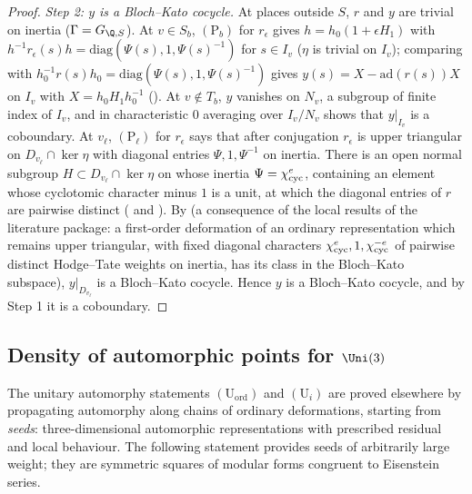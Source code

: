 \begin{proof}
\emph{Step 2: $y$ is a Bloch--Kato cocycle.} At places outside $S$, $r$ and $y$ are trivial on inertia ($\Gamma=G_{\Q,S}$). At $v\in S_b$,
$(\mathrm P_b)$ for $r_\epsilon$ gives $h=h_0(1+\epsilon H_1)$ with $h^{-1}r_\epsilon(s)h=\mathrm{diag}(\Psi(s),1,\Psi(s)^{-1})$ for $s\in I_v$ ($\eta$ is trivial on
$I_v$); comparing with $h_0^{-1}r(s)h_0=\mathrm{diag}(\Psi(s),1,\Psi(s)^{-1})$ gives $y(s)=X-\mathrm{ad}(r(s))X$ on $I_v$ with $X=h_0H_1h_0^{-1}$
(). At $v\notin T_b$, $y$ vanishes on $N_v$, a subgroup of finite index of $I_v$, and
in characteristic $0$ averaging over $I_v/N_v$ shows that $y|_{I_v}$ is a coboundary. At $v_\ell$, $(\mathrm P_\ell)$ for $r_\epsilon$ says that after
conjugation $r_\epsilon$ is upper triangular on $D_{v_\ell}\cap\ker\eta$ with diagonal entries $\Psi,1,\Psi^{-1}$ on inertia. There is an open normal
subgroup $H\subset D_{v_\ell}\cap\ker\eta$ on whose inertia $\Psi=\chi_{\mathrm{cyc}}^e$, containing an element whose cyclotomic character minus $1$ is a unit, at
which the diagonal entries of $r$ are pairwise distinct ( and ).
By  (a consequence of the local results of the literature package: a first-order
deformation of an ordinary representation which remains upper triangular, with fixed diagonal characters $\chi_{\mathrm{cyc}}^{e},1,\chi_{\mathrm{cyc}}^{-e}$ of
pairwise distinct Hodge--Tate weights on inertia, has its class in the Bloch--Kato subspace), $y|_{D_{v_\ell}}$ is a Bloch--Kato cocycle.
Hence $y$ is a Bloch--Kato cocycle, and by Step 1 it is a coboundary.
\end{proof}

\subsection{Density of automorphic points for \texorpdfstring{$\Uni(3)$}{U(3)}}\label{sec:pf:eis:dense}

The unitary automorphy statements $(\mathrm{U}_{\mathrm{ord}})$ and $(\mathrm{U}_i)$ are proved elsewhere by propagating automorphy
along chains of ordinary deformations, starting from \emph{seeds}: three-dimensional automorphic representations with prescribed
residual and local behaviour. The following statement provides seeds of arbitrarily large weight; they are symmetric squares of
modular forms congruent to Eisenstein series.

